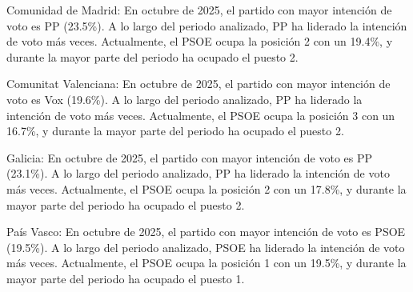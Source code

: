 \documentclass[
  letterpaper,
  DIV=11,
  numbers=noendperiod]{scrreprt}
\begin{document}
Comunidad de Madrid: En octubre de 2025, el partido con mayor intención
de voto es PP (23.5\%). A lo largo del periodo analizado, PP ha liderado
la intención de voto más veces. Actualmente, el PSOE ocupa la posición 2
con un 19.4\%, y durante la mayor parte del periodo ha ocupado el puesto
2.

Comunitat Valenciana: En octubre de 2025, el partido con mayor intención
de voto es Vox (19.6\%). A lo largo del periodo analizado, PP ha
liderado la intención de voto más veces. Actualmente, el PSOE ocupa la
posición 3 con un 16.7\%, y durante la mayor parte del periodo ha
ocupado el puesto 2.

Galicia: En octubre de 2025, el partido con mayor intención de voto es
PP (23.1\%). A lo largo del periodo analizado, PP ha liderado la
intención de voto más veces. Actualmente, el PSOE ocupa la posición 2
con un 17.8\%, y durante la mayor parte del periodo ha ocupado el puesto
2.

País Vasco: En octubre de 2025, el partido con mayor intención de voto
es PSOE (19.5\%). A lo largo del periodo analizado, PSOE ha liderado la
intención de voto más veces. Actualmente, el PSOE ocupa la posición 1
con un 19.5\%, y durante la mayor parte del periodo ha ocupado el puesto
1.
\end{document}
